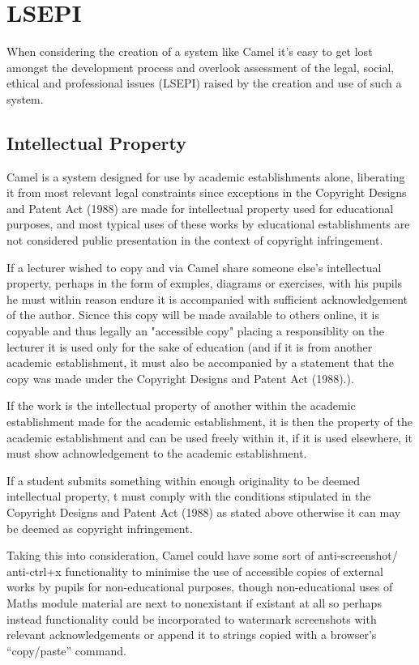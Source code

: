 \section{LSEPI}
    When considering the creation of a system like Camel it’s easy to get lost amongst the development process and overlook assessment of the legal, social, ethical and professional issues (LSEPI) raised by the creation and use of such a system.
    
    \subsection*{Intellectual Property}
    Camel is a system designed for use by academic establishments alone, liberating it from most relevant legal constraints since exceptions in the Copyright Designs and Patent Act (1988) are made for intellectual property used for educational purposes, and most typical uses of these works by educational establishments are not considered public presentation in the context of copyright infringement.
        
    If a lecturer wished to copy and via Camel share someone else's intellectual property, perhaps in the form of exmples, diagrams or exercises, with his pupils he must within reason endure it is accompanied with sufficient acknowledgement of the author. Sicnce this copy will be made available to others online, it is copyable and thus legally an "accessible copy" placing a responsiblity on the lecturer it is used only for the sake of education (and if it is from another academic establishment, it must also be accompanied by a statement that the copy was made under the Copyright Designs and Patent Act (1988).\cite[(Pt 1, Ch 3, §31B)]{CDaPA}).
    
    If the work is the intellectual property of another within the academic establishment made for the academic establishment, it is then the property of the academic establishment and can be used freely within it, if it is used elsewhere, it must show achnowledgement to the academic establishment.
    
    If a student submits something within enough originality to be deemed intellectual property, t must comply  with the conditions stipulated in the Copyright Designs and Patent Act (1988) as stated above otherwise it can may be deemed as copyright infringement.
    
    Taking this into consideration, Camel could have some sort of anti-screenshot/ anti-ctrl+x functionality to minimise the use of accessible copies of external works by pupils for non-educational purposes, though non-educational uses of Maths module material are next to nonexistant if existant at all so perhaps instead functionality could be incorporated to watermark screenshots with relevant acknowledgements or append it to strings copied with a browser’s “copy/paste” command.
    
